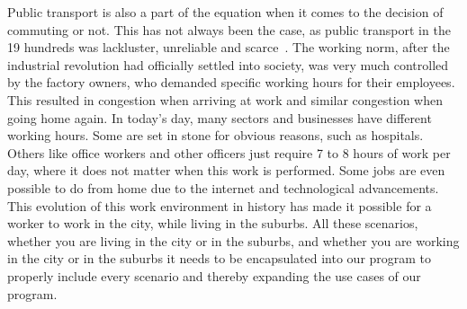 Public transport is also a part of the equation when it comes to the decision of commuting or not.
This has not always been the case, as public transport in the 19 hundreds was lackluster, unreliable and scarce~\cite{bek2022}.
The working norm, after the industrial revolution had officially settled into society, was very much controlled by the
factory owners, who demanded specific working hours for their employees.
This resulted in congestion when arriving at work and similar congestion when going home again.
In today's day, many sectors and businesses have different working hours.
Some are set in stone for obvious reasons, such as hospitals.
Others like office workers and other officers just require 7 to 8 hours of work per day, where it does not matter when
this work is performed.
Some jobs are even possible to do from home due to the internet and technological advancements.
This evolution of this work environment in history has made it possible for a worker to work in the city, while living
in the suburbs.
All these scenarios, whether you are living in the city or in the suburbs, and whether you are working in the city or
in the suburbs it needs to be encapsulated into our program to properly include every scenario and thereby expanding the
use cases of our program.
